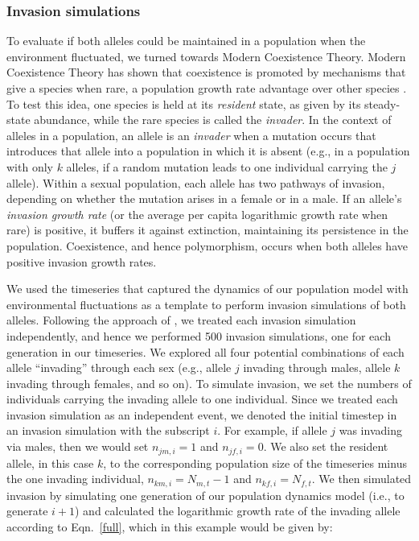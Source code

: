 \begin{refsection}
\subsubsection*{Invasion simulations}

 To evaluate if both alleles could be maintained in a population when the environment fluctuated, we turned towards Modern Coexistence Theory. Modern Coexistence Theory has shown that coexistence is promoted by mechanisms that give a species when rare, a population growth rate advantage over other species \citep{chesson_multispecies_1994,chesson2000mechanisms, barabas_chessons_2018}. To test this idea, one species is held at its \textit{resident} state, as given by its steady-state abundance, while the rare species is called the \textit{invader}. In the context of alleles in a population, an allele is an \textit{invader} when a mutation occurs that introduces that allele into a population in which it is absent (e.g., in a population with only $k$ alleles, if a random mutation leads to one individual carrying the $j$ allele). Within a sexual population, each allele has two pathways of invasion, depending on whether the mutation arises in a female or in a male. If an allele's \textit{invasion growth rate} (or the average per capita logarithmic growth rate when rare) is positive, it buffers it against extinction, maintaining its persistence in the population.  Coexistence, and hence polymorphism, occurs when both alleles have positive invasion growth rates.

We used the timeseries that captured the dynamics of our population model with environmental fluctuations as a template to perform invasion simulations of both alleles. Following the approach of \citet{ellner2016quantify}, we treated each invasion simulation independently, and hence we performed 500 invasion simulations, one for each generation in our timeseries. We explored all four potential combinations of each allele ``invading'' through each sex (e.g., allele $j$ invading through males, allele $k$ invading through females, and so on). To simulate invasion, we set the numbers of individuals carrying the invading allele to one individual. Since we treated each invasion simulation as an independent event, we denoted the initial timestep in an invasion simulation with the subscript $i$. For example, if allele $j$ was invading via males, then we would set $n_{jm,i} = 1$ and $n_{jf,i}= 0$. We also set the resident allele, in this case $k$, to the corresponding population size of the timeseries minus the one invading individual, $n_{km,i} = N_{m,t} -1$ and $n_{kf,i} = N_{f,t}$. We then simulated invasion by simulating one generation of our population dynamics model (i.e., to generate $i+1$) and calculated the logarithmic growth rate of the invading allele according to Eqn.~\ref{full}, which in this example would be given by:



\end{refsection}
